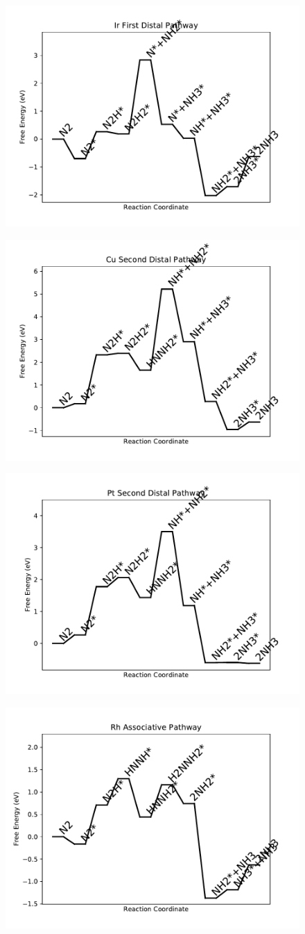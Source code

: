 \documentclass[journal=jacsat,manuscript=article]{achemso}
\begin{document}
\begin{figure}
\includegraphics[width=0.5\linewidth]{data/plots/Ir_distal_1.pdf}
\label{fig:Ir_distal_1}
\end{figure}

\newpage
\begin{figure}
\includegraphics[width=0.5\linewidth]{data/plots/Cu_distal_2.pdf}
\label{fig:Cu_distal_2}
\end{figure}

\begin{figure}
\includegraphics[width=0.5\linewidth]{data/plots/Pt_distal_2.pdf}
\label{fig:Pt_distal_2}
\end{figure}

\newpage
\begin{figure}
\includegraphics[width=0.5\linewidth]{data/plots/Rh_associative.pdf}
\label{fig:Rh_associative}
\end{figure}
\end{document}
